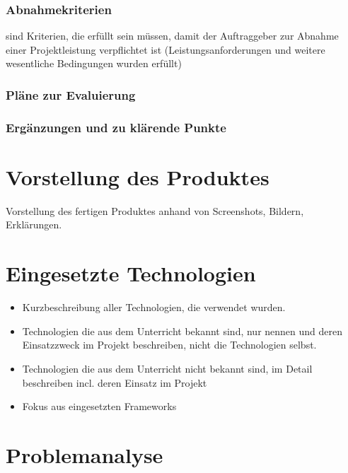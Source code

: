 \subsection{Abnahmekriterien}

sind Kriterien, die erfüllt sein müssen, damit der Auftraggeber zur Abnahme einer Projektleistung verpflichtet ist (Leistungsanforderungen und weitere wesentliche Bedingungen wurden erfüllt)
\subsection{Pläne zur Evaluierung}
\subsection{Ergänzungen und zu klärende Punkte}

\chapter{Vorstellung des Produktes}
Vorstellung des fertigen Produktes anhand von Screenshots, Bildern, Erklärungen.

\chapter{Eingesetzte Technologien}
\begin{itemize}
	\item Kurzbeschreibung aller Technologien, die verwendet wurden.
	\item Technologien die aus dem Unterricht bekannt sind, nur nennen und deren  Einsatzzweck im Projekt beschreiben, nicht die Technologien selbst.
	\item Technologien die aus dem Unterricht nicht bekannt sind, im Detail beschreiben incl. deren Einsatz im Projekt
	\item Fokus aus eingesetzten Frameworks
\end{itemize}

\chapter{Problemanalyse}
